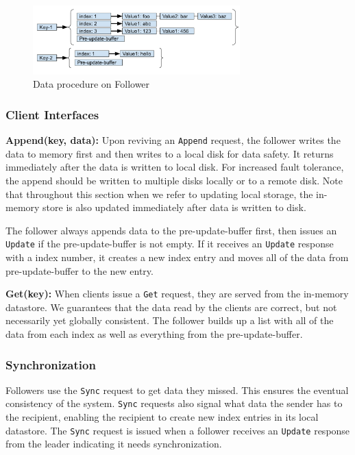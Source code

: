 \documentclass[11pt,english,twocolumn]{article}
\begin{document}
\begin{figure}[h]
\includegraphics[width=8cm]{figure/DataStructure.pdf}
\caption{Data procedure on Follower}
\label{DataStructure}
\end{figure}

\subsubsection{Client Interfaces}
\textbf{Append(key, data):} Upon reviving an \texttt{Append} request, the
follower writes the data to memory first and then writes to a local disk for data
safety. It returns immediately after the data is written to local disk. For
increased fault tolerance, the append should be written to multiple disks
locally or to a remote disk. Note that throughout this section when we
refer to updating local storage, the in-memory store is also updated immediately
after data is written to disk.

The follower always appends data to the pre-update-buffer first, then issues an
\texttt{Update} if the pre-update-buffer is not empty. If it receives an
\texttt{Update} response with a index number, it creates a new index entry and
moves all of the data from pre-update-buffer to the new entry. 

\noindent \textbf{Get(key):} When clients issue a \texttt{Get} request, they are
served from the in-memory datastore. We guarantees that the data read by the
clients are correct, but not necessarily yet globally consistent. The follower
builds up a list with all of the data from each index as well as everything from
the pre-update-buffer.

\subsubsection{Synchronization}
Followers use the \texttt{Sync} request to get data they missed. This ensures
the eventual consistency of the system. \texttt{Sync} requests also signal what
data the sender has to the recipient, enabling the recipient to create new index
entries in its local datastore. The \texttt{Sync} request is issued when a
follower receives an \texttt{Update} response from the leader indicating it
needs synchronization. 
\end{document}
